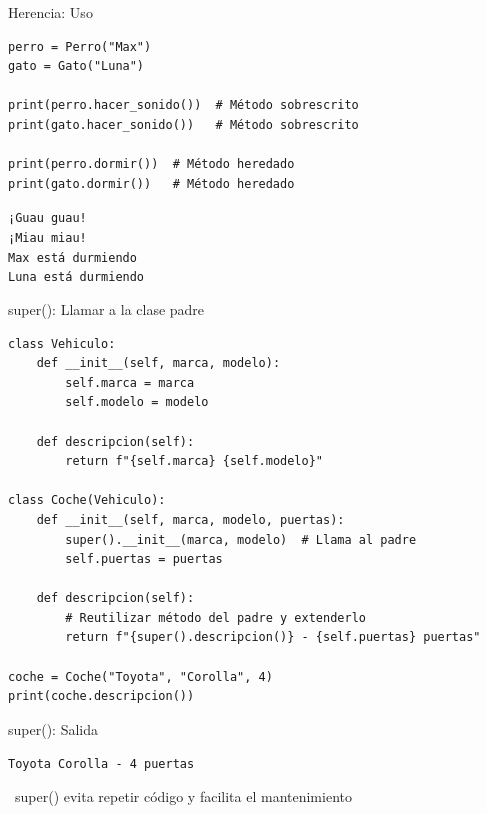\documentclass{beamer}
\begin{document}
\begin{frame}[fragile]{Herencia: Uso \faDog}
\begin{lstlisting}
perro = Perro("Max")
gato = Gato("Luna")

print(perro.hacer_sonido())  # Método sobrescrito
print(gato.hacer_sonido())   # Método sobrescrito

print(perro.dormir())  # Método heredado
print(gato.dormir())   # Método heredado
\end{lstlisting}

\vspace{-0.2cm}
\begin{tcolorbox}[colback=green!10,colframe=green,title={\small\faArrowCircleRight \ Salida},coltitle=fg0,left=3pt,right=3pt,top=3pt,bottom=3pt,boxsep=2pt]
\small\texttt{¡Guau guau!\\
¡Miau miau!\\
Max está durmiendo\\
Luna está durmiendo}
\end{tcolorbox}
\end{frame}

\begin{frame}[fragile]{super(): Llamar a la clase padre \faArrowUp}
\begin{lstlisting}
class Vehiculo:
    def __init__(self, marca, modelo):
        self.marca = marca
        self.modelo = modelo
    
    def descripcion(self):
        return f"{self.marca} {self.modelo}"

class Coche(Vehiculo):
    def __init__(self, marca, modelo, puertas):
        super().__init__(marca, modelo)  # Llama al padre
        self.puertas = puertas
    
    def descripcion(self):
        # Reutilizar método del padre y extenderlo
        return f"{super().descripcion()} - {self.puertas} puertas"

coche = Coche("Toyota", "Corolla", 4)
print(coche.descripcion())
\end{lstlisting}
\end{frame}

\begin{frame}[fragile]{super(): Salida \faArrowCircleRight}
\begin{tcolorbox}[colback=green!10,colframe=green,title={\small\faArrowCircleRight \ Salida},coltitle=fg0,left=3pt,right=3pt,top=3pt,bottom=3pt,boxsep=2pt]
\small\texttt{Toyota Corolla - 4 puertas}
\end{tcolorbox}

\vspace{0.3cm}
\begin{notebox}
\small\faLightbulb\ super() evita repetir código y facilita el mantenimiento
\end{notebox}
\end{frame}
\end{document}
